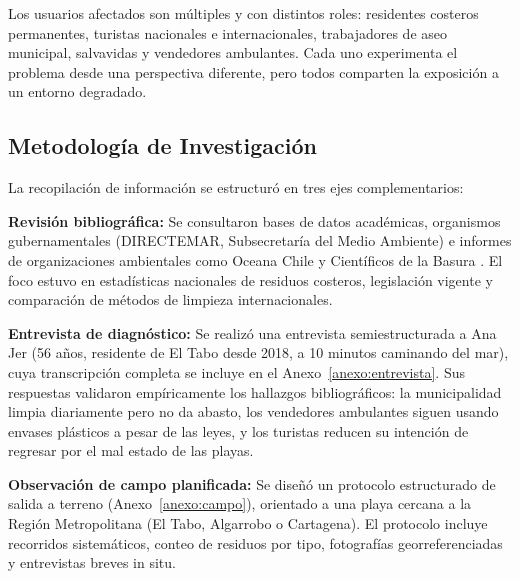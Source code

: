\documentclass[12pt, letterpaper]{article}
\begin{document}
\vspace{0.5cm}
\begin{center}
	\fboxsep=10pt
\end{center}
\vspace{0.5cm}

Los usuarios afectados son múltiples y con distintos roles: residentes costeros permanentes,
turistas nacionales e internacionales, trabajadores de aseo municipal, salvavidas y
vendedores ambulantes. Cada uno experimenta el problema desde una perspectiva diferente,
pero todos comparten la exposición a un entorno degradado.

\subsection{Metodología de Investigación}

La recopilación de información se estructuró en tres ejes complementarios:

\textbf{Revisión bibliográfica:} Se consultaron bases de datos académicas, organismos
gubernamentales (DIRECTEMAR, Subsecretaría del Medio Ambiente) e informes de
organizaciones ambientales como Oceana Chile y Científicos de la Basura \parencite{araya_2026}.
El foco estuvo en estadísticas nacionales de residuos costeros, legislación vigente y
comparación de métodos de limpieza internacionales.

\textbf{Entrevista de diagnóstico:} Se realizó una entrevista semiestructurada a Ana Jer
(56 años, residente de El Tabo desde 2018, a 10 minutos caminando del mar), cuya
transcripción completa se incluye en el Anexo~\ref{anexo:entrevista}.
Sus respuestas validaron empíricamente los hallazgos bibliográficos: la municipalidad
limpia diariamente pero no da abasto, los vendedores ambulantes siguen usando envases
plásticos a pesar de las leyes, y los turistas reducen su intención de regresar por el
mal estado de las playas.

\textbf{Observación de campo planificada:} Se diseñó un protocolo estructurado de
salida a terreno (Anexo~\ref{anexo:campo}), orientado a una playa cercana a la Región
Metropolitana (El Tabo, Algarrobo o Cartagena). El protocolo incluye recorridos
sistemáticos, conteo de residuos por tipo, fotografías georreferenciadas y entrevistas
breves in situ.
\end{document}
